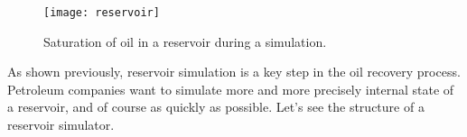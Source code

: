 \begin{figure}[!ht]
  \centering
  \texttt{[image: reservoir]}
  \caption{Saturation of oil in a reservoir during a simulation.}
\label{fig:floviz}
\end{figure}


As shown previously, reservoir simulation is a key step in the oil recovery process.
%
Petroleum companies want to simulate more and more precisely internal state of a reservoir, and of course as quickly as possible.
%
Let's see the structure of a reservoir simulator.
